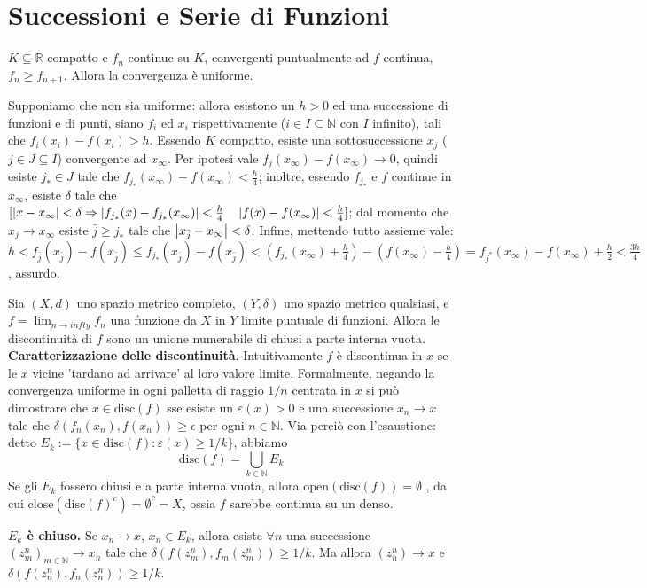 \section{Successioni e Serie di Funzioni}
 $K\subseteq\mathbb R$ compatto e $f_n$ continue su $K$, convergenti puntualmente ad $f$ continua, $f_n\ge f_{n+1}$. Allora la convergenza è uniforme.

Supponiamo che non sia uniforme: allora esistono un $h>0$ ed una successione di funzioni e di punti, siano $f_i$ ed $x_i$ rispettivamente ($i\in I\subseteq\mathbb N$ con $I$ infinito), tali che $f_i(x_i)-f(x_i)>h$. Essendo $K$ compatto, esiste una sottosuccessione $x_j$ ($j\in J\subseteq I$) convergente ad $x_\infty$. Per ipotesi vale $f_j(x_\infty)-f(x_\infty)\rightarrow 0$, quindi esiste $j_*\in J$ tale che $f_{j_*}(x_\infty)-f(x_\infty)<\frac{h}{4}$; inoltre, essendo $f_{j_*}$ e $f$ continue in $x_\infty$, esiste $\delta$ tale che $[\left|x-x_\infty\right|<\delta\Rightarrow\left|f_{j_*}(x)-f_{j_*}(x_\infty)\right|<\frac{h}{4} \quad \left|f(x)-f(x_\infty)\right|<\frac{h}{4}]$; dal momento che $x_j\rightarrow x_\infty$ esiste $\bar j\ge j_*$ tale che $\left|x_{\bar j}-x_\infty\right|<\delta$. Infine, mettendo tutto assieme vale: $h<f_{\bar j}(x_{\bar j})-f(x_{\bar j})\le f_{j_*}(x_{\bar j})-f(x_{\bar j})<(f_{j_*}(x_\infty)+\frac{h}{4})-(f(x_\infty)-\frac{h}{4})=f_{j^*}(x_\infty)-f(x_\infty)+\frac{h}{2}<\frac{3h}{4}$, assurdo.


 Sia $(X,d)$ uno spazio metrico completo, $(Y, \delta)$ uno spazio metrico qualsiasi, e 
$f= \lim_{n \to infty} f_n$ una funzione da $X$ in $Y$ limite puntuale di funzioni. Allora le discontinuità di $f$ sono un unione numerabile di chiusi a parte interna vuota.
\textbf{Caratterizzazione delle discontinuità}. Intuitivamente $f$ è discontinua in $x$ se le $x$ vicine 'tardano ad arrivare' al loro valore limite. Formalmente, negando la convergenza uniforme in ogni palletta di raggio $1/n$ centrata in $x$ si può dimostrare che $x \in \mathrm{disc}(f)$ sse esiste un $\varepsilon(x) > 0$ e una successione $x_n \rightarrow x$ tale che $\delta( f_n(x_n), f(x_n) ) \ge \epsilon$ per ogni $n \in \mathbb{N}$. Via perciò con l'esaustione: detto $E_k := \{x \in \mathrm{disc}(f): \varepsilon(x) \ge 1/k\}$, abbiamo 
$$ \mathrm{disc}(f) = \bigcup_{k \in \mathbb{N}} E_k $$
Se gli $E_k$ fossero chiusi e a parte interna vuota, allora $\mathrm{open} (\mathrm{disc}(f)) = \emptyset$ , 
da cui $\mathrm{close}( \mathrm{disc}(f)^{c} ) = \emptyset^c = X$, ossia $f$ sarebbe continua su un denso.

\textbf{$E_k$ è chiuso.} 
Se $x_n \rightarrow x$, $x_n \in E_k$, allora esiste $\forall n$ una successione \newline 
$(z^n_m )_{m \in \mathbb{N}} \rightarrow x_n$ tale che $\delta(f(z^n_m), f_m(z^n_m) ) \ge 1/k$. \newline
Ma allora $(z^n_n) \rightarrow x$ e $\delta(f(z^n_n), f_n(z^n_n) ) \ge 1/k$. \newline

